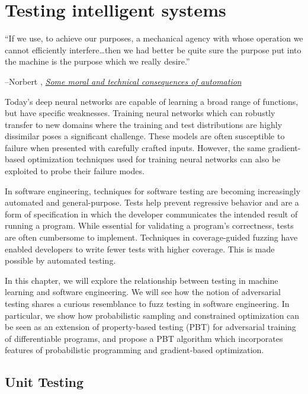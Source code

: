 \documentclass[12pt,initial,twoside,maitrise]{dms}
\numberwithin{equation}{section}
\numberwithin{table}{chapter}
\numberwithin{figure}{chapter}
\begin{document}
\chapter{Testing intelligent systems}\label{ch:difftest}

\setlength{\epigraphwidth}{0.80\textwidth}
\epigraph{``If we use, to achieve our purposes, a mechanical agency with whose operation we cannot efficiently interfere\ldots then we had better be quite sure the purpose put into the machine is the purpose which we really desire.''}{\begin{flushright}--Norbert \citet{wiener1960some}, \href{https://www.ias.ac.in/article/fulltext/reso/004/01/0080-0088}{\textit{Some moral and technical consequences of automation}}~\end{flushright}}

Today's deep neural networks are capable of learning a broad range of functions, but have specific weaknesses. Training neural networks which can robustly transfer to new domains where the training and test distributions are highly dissimilar poses a significant challenge. These models are often susceptible to failure when presented with carefully crafted inputs. However, the same gradient-based optimization techniques used for training neural networks can also be exploited to probe their failure modes.

In software engineering, techniques for software testing are becoming increasingly automated and general-purpose. Tests help prevent regressive behavior and are a form of specification in which the developer communicates the intended result of running a program. While essential for validating a program's correctness, tests are often cumbersome to implement. Techniques in coverage-guided fuzzing have enabled developers to write fewer tests with higher coverage. This is made possible by automated testing.

In this chapter, we will explore the relationship between testing in machine learning and software engineering. We will see how the notion of adversarial testing shares a curious resemblance to fuzz testing in software engineering. In particular, we show how probabilistic sampling and constrained optimization can be seen as an extension of property-based testing (PBT) for adversarial training of differentiable programs, and propose a PBT algorithm which incorporates features of probabilistic programming and gradient-based optimization.

\section{Unit Testing}
\end{document}
